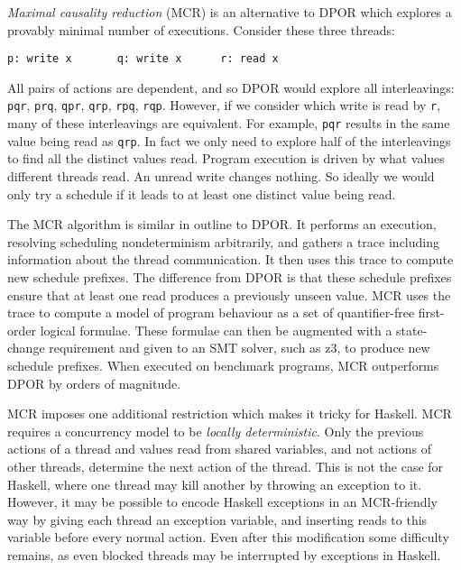 \emph{Maximal causality reduction} (MCR)\cite{huang2015,huang2017} is
an alternative to DPOR which explores a provably minimal number of
executions.  Consider these three threads:

\begin{center}
\verb|p: write x       q: write x      r: read x|
\end{center}

All pairs of actions are dependent, and so DPOR would explore all
interleavings: \texttt{pqr}, \texttt{prq}, \texttt{qpr}, \texttt{qrp},
\texttt{rpq}, \texttt{rqp}.  However, if we consider which write is
read by \texttt{r}, many of these interleavings are equivalent.  For
example, \texttt{pqr} results in the same value being read as
\texttt{qrp}.  In fact we only need to explore half of the
interleavings to find all the distinct values read.  Program execution
is driven by what values different threads read.  An unread write
changes nothing.  So ideally we would only try a schedule if it leads
to at least one distinct value being read.

The MCR algorithm is similar in outline to DPOR\@.  It performs an
execution, resolving scheduling nondeterminism arbitrarily, and
gathers a trace including information about the thread communication.
It then uses this trace to compute new schedule prefixes.  The
difference from DPOR is that these schedule prefixes ensure that at
least one read produces a previously unseen value.  MCR uses the trace
to compute a model of program behaviour as a set of quantifier-free
first-order logical formulae.  These formulae can then be augmented
with a state-change requirement and given to an SMT
solver\cite{demoura2011}, such as z3\cite{demoura2008}, to produce new
schedule prefixes.  When executed on benchmark programs, MCR
outperforms DPOR by orders of magnitude\cite{huang2017}.

MCR imposes one additional restriction which makes it tricky for
Haskell.  MCR requires a concurrency model to be \emph{locally
  deterministic}\cite{huang2015}.  Only the previous actions of a
thread and values read from shared variables, and not actions of other
threads, determine the next action of the thread.  This is not the
case for Haskell, where one thread may kill another by throwing an
exception to it.  However, it may be possible to encode Haskell
exceptions in an MCR-friendly way by giving each thread an exception
variable, and inserting reads to this variable before every normal
action.  Even after this modification some difficulty remains, as even
blocked threads may be interrupted by exceptions in Haskell.

